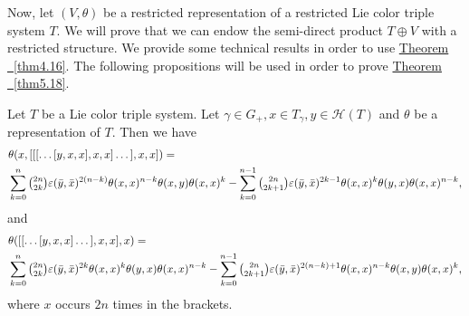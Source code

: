\documentclass[11pt, twoside]{article}
\begin{document}

Now, let $(V,\theta) $ be a restricted representation of a restricted Lie color triple system $T$. We will prove that we can endow the semi-direct product $T\oplus V $ with a restricted structure. We provide some technical results in order to use \hyperref[thm4.16]{Theorem ~\ref*{thm4.16}}. The following propositions will be used in order to prove \hyperref[thm5.18]{Theorem ~\ref*{thm5.18}}. 

\begin{prop}\label{p5.14}
    Let $T$ be a Lie color triple system. Let  $\gamma\in G_+ ,x\in T_\gamma, y\in \mathcal{H}(T) $ and $\theta$ be a representation of $T$. Then we have \begin{align*}
      &  \theta(x,[[[\dots[y,x,x],x,x]\dots],x,x])=\\ & \sum\limits_{k=0}^n\tbinom{2n}{2k}\varepsilon(\bar{y},\bar{x})^{2(n-k)}\theta(x,x)^{n-k}\theta(x,y)\theta(x,x)^k - \sum\limits_{k=0}^{n-1}\tbinom{2n}{2k+1}\varepsilon(\bar{y},\bar{x})^{2k-1}\theta(x,x)^k\theta(y,x)\theta(x,x)^{n-k} ,
    \end{align*} and \begin{align*}
       & \theta([[\dots[y,x,x]\dots],x,x],x)= \\& \sum\limits_{k=0}^n\tbinom{2n}{2k}\varepsilon(\bar{y},\bar{x})^{2k}\theta(x,x)^k\theta(y,x)\theta(x,x)^{n-k} - \sum\limits_{k=0}^{n-1}\tbinom{2n}{2k+1}\varepsilon(\bar{y},\bar{x})^{2(n-k)+1}\theta(x,x)^{n-k}\theta(x,y)\theta(x,x)^k ,
    \end{align*} where $x$ occurs $2n$ times in the brackets.
\end{prop}
\end{document}
